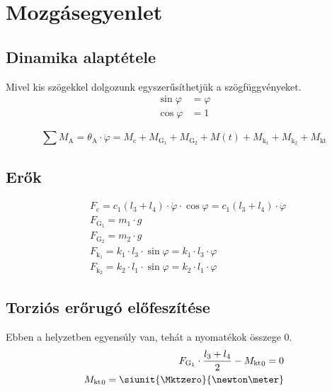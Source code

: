 \section{Mozgásegyenlet}

\szta
\newpage

\subsection{Dinamika alaptétele}

Mivel kis szögekkel dolgozunk egyszerűsíthetjük a szögfüggvényeket.
\begin{align}
    \sin{\varphi} & = \varphi \\
    \cos{\varphi} & = 1
\end{align}

\begin{equation}
    \sum{M_\text{A}}
    = \theta_\text{A} \cdot \ddot{\varphi}
    = M_\text{c} + M_{{\text{G}}_1} + M_{{\text{G}}_2} + M(t) + M_{\text{k}_1} + M_{\text{k}_2} + M_\text{kt}
\end{equation}

\subsection{Erők}
\begin{align}
     & F_\text{c}
    = c_1(l_3 + l_4) \cdot \dot{\varphi} \cdot \cos{\varphi}
    = c_1(l_3 + l_4) \cdot \dot{\varphi} \\
     & F_{{\text{G}}_1}
    = m_1 \cdot g                        \\
     & F_{{\text{G}}_2}
    = m_2 \cdot g                        \\
     & F_{\text{k}_1}
    = k_1 \cdot l_3 \cdot \sin{\varphi}
    = k_1 \cdot l_3 \cdot \varphi        \\
     & F_{\text{k}_2}
    =k_2 \cdot l_1 \cdot \sin{\varphi}
    =k_2 \cdot l_1 \cdot \varphi
\end{align}

\subsection{Torziós erőrugó előfeszítése}
\staticszta
Ebben a helyzetben egyensúly van, tehát a nyomatékok összege $0$.
\begin{align}
    F_{\text{G}_1} \cdot \frac{l_3 + l_4}{2} - {M_\text{kt}}_0 = 0 \\
    {M_\text{kt}}_0 = \siunit{\Mktzero}{\newton\meter}
\end{align}

